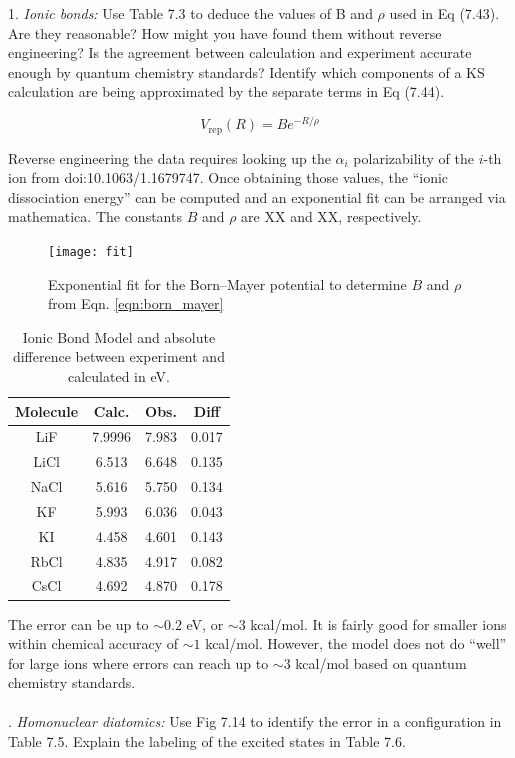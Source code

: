 \documentclass{article}
\begin{document}
  1. \textit{Ionic bonds:} Use Table 7.3 to deduce the values of B and $\rho$ used in
  Eq (7.43). Are they reasonable? How might you have found them without reverse engineering?
  Is the agreement between calculation and experiment accurate enough by quantum chemistry
  standards? Identify which components of a KS calculation are being approximated by the
  separate terms in Eq (7.44).

  \begin{equation}
    V_{\text{rep}}(R) = Be^{-R/\rho}
    \label{eqn:born_mayer}
  \end{equation}

  Reverse engineering the data requires looking up the $\alpha_i$ polarizability
  of the $i$-th ion from doi:10.1063/1.1679747. Once obtaining those values, the
  ``ionic dissociation energy'' can be computed and an exponential fit can be
  arranged via mathematica. The constants $B$ and $\rho$ are XX and XX, respectively.

  \begin{figure}[H]
    \centering
    \texttt{[image: fit]}
    \caption{Exponential fit for the Born--Mayer potential to determine $B$ and
      $\rho$ from Eqn. \eqref{eqn:born_mayer}}
    \label{fig:fit}
  \end{figure}
  
  \begin{table}[H]
    \centering
    \caption{Ionic Bond Model and absolute difference between experiment and calculated
      in eV.}
    \begin{tabular}{cccc}
      Molecule & Calc. & Obs. & Diff \\
      \hline
      LiF  & 7.9996 & 7.983 & 0.017 \\
      LiCl & 6.513  & 6.648 & 0.135 \\
      NaCl & 5.616  & 5.750 & 0.134 \\
      KF   & 5.993  & 6.036 & 0.043 \\
      KI   & 4.458  & 4.601 & 0.143 \\
      RbCl & 4.835  & 4.917 & 0.082 \\
      CsCl & 4.692  & 4.870 & 0.178
    \end{tabular}
  \end{table}
  
  The error can be up to $\sim 0.2$ eV, or $\sim 3$ kcal/mol. It is fairly good for smaller
  ions within chemical accuracy of $\sim 1$ kcal/mol. However, the model does not do ``well''
  for large ions where errors can reach up to $\sim 3$ kcal/mol based on quantum chemistry
  standards.
  \\
  \\
  . \textit{Homonuclear diatomics:} Use Fig 7.14 to identify the error in a configuration
  in Table 7.5. Explain the labeling of the excited states in Table 7.6.
  \\
\end{document}
